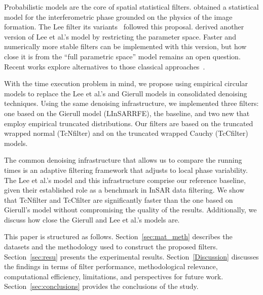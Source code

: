 \documentclass[remotesensing,article,submit,pdftex,moreauthors]{Definitions/mdpi}
\begin{document}
Probabilistic models are the core of spatial statistical filters.
\citet{IntensityAndPhaseStatisticsOfMultilookPolarimetricAndInterferometricSARimagery} obtained a statistical model for the interferometric phase grounded on the physics of the image formation.
The Lee filter its variants~\cite{ImprovedSigmaFilterforSpeckleFilteringofSARImagery, AnewtechniquefornoisefilteringofSARinterferometricphasimages, RefinedFilteringofInterferometricPhaseFromInSARData} followed this proposal. 
\citet{ClosedFormExpressionsforInSARSampleStatisticsandItsApplicationtoNonGaussianData} derived another version of Lee et al.'s model by restricting the parameter space.
Faster and numerically more stable filters can be implemented with this version, but how close it is from the ``full parametric space'' model remains an open question.
Recent works explore alternatives to those classical approaches~\citep{AngularConsistencyAdaptiveFilteringandComplexGeneralizedGaussianBasedPhaseLinkingforDSInSAR,CLTCPLaRobustMathematicalFrameworkandAlgorithmforInSARPhaseLinkingUsingtheCentralLimitTheoremofCircularStatistics}.

With the time execution problem in mind, we propose using empirical circular models to replace the Lee et al.'s and Gierull models in consolidated denoising techniques.
Using the same denoising infrastructure, we implemented three filters: 
one based on the Gierull model (LInSARRFE), the baseline, and 
two new that employ empirical truncated distributions.
Our filters are based on the truncated wrapped normal (TcNfilter) and on the truncated wrapped Cauchy (TcCfilter) models. 

The common denoising infrastructure that allows us to compare the running times is an adaptive filtering framework that adjusts to local phase variability.
The Lee et al.'s model and this infrastructure comprise our reference baseline, given their established role as a benchmark in InSAR data filtering.
We show that TcNfilter and TcCfilter are significantly faster than the one based on Gierull's model without compromising the quality of the results.
Additionally, we discuss how close the Gierull and Lee et al.'s models are.


This paper is structured as follows.
Section~\ref{sec:mat_meth} describes the datasets and the methodology used to construct the proposed filters.
Section~\ref{sec:resu} presents the experimental results.
Section~\ref{Discussion} discusses the findings in terms of filter performance, methodological relevance, computational efficiency, limitations, and perspectives for future work.
Section~\ref{sec:conclusions} provides the conclusions of the study.
\end{document}
